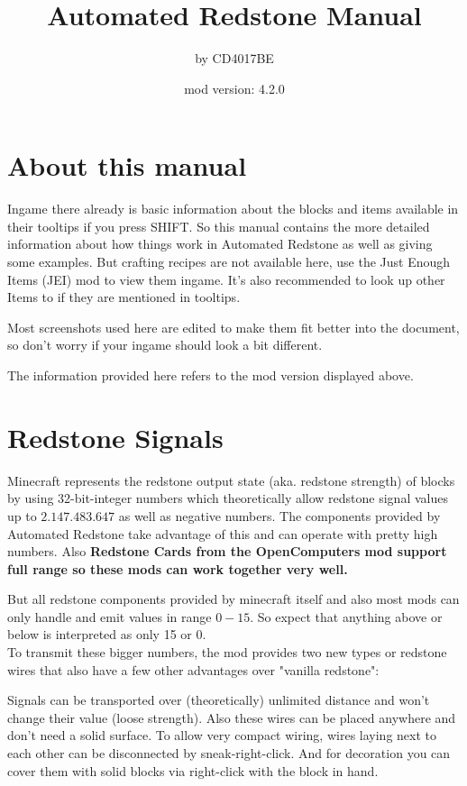 \documentclass[11pt]{article} %
\title{Automated Redstone Manual}
\author{by CD4017BE}
\date{mod version: 4.2.0}
\begin{document}
 \maketitle
 \tableofcontents
 
 \section{About this manual}  
Ingame there already is basic information about the blocks and items available in their tooltips if you press SHIFT. So this manual contains the more detailed information about how things work in Automated Redstone as well as giving some examples. But crafting recipes are not available here, use the Just Enough Items (JEI) mod to view them ingame. It's also recommended to look up other Items to if they are mentioned in tooltips.

Most screenshots used here are edited to make them fit better into the document, so don't worry if your ingame should look a bit different. 

The information provided here refers to the mod version displayed above.

\section{Redstone Signals}
Minecraft represents the redstone output state (aka. redstone strength) of blocks by using 32-bit-integer numbers which theoretically allow redstone signal values up to $2.147.483.647$ as well as negative numbers. The components provided by Automated Redstone take advantage of this and can operate with pretty high numbers. Also \bf Redstone Cards \bf from the \bf OpenComputers \rm mod support full range so these mods can work together very well.

But all redstone components provided by minecraft itself and also most mods can only handle and emit values in range $0-15$. So expect that anything above or below is interpreted as only 15 or 0.\\

To transmit these bigger numbers, the mod provides two new types or redstone wires that also have a few other advantages over "vanilla redstone":

Signals can be transported over (theoretically) unlimited distance and won't change their value (loose strength). Also these wires can be placed anywhere and don't need a solid surface.
To allow very compact wiring, wires laying next to each other can be disconnected by sneak-right-click. And for decoration you can cover them with solid blocks via right-click with the block in hand.
\end{document}

